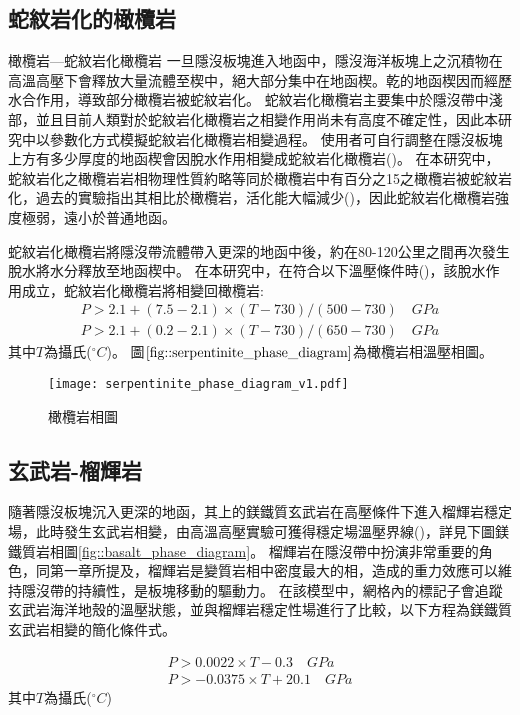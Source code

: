 \subsection{蛇紋岩化的橄欖岩}
橄欖岩---蛇紋岩化橄欖岩
一旦隱沒板塊進入地函中，隱沒海洋板塊上之沉積物在高溫高壓下會釋放大量流體至楔中，絕大部分集中在地函楔。乾的地函楔因而經歷水合作用，導致部分橄欖岩被蛇紋岩化。
蛇紋岩化橄欖岩主要集中於隱沒帶中淺部，並且目前人類對於蛇紋岩化橄欖岩之相變作用尚未有高度不確定性，因此本研究中以參數化方式模擬蛇紋岩化橄欖岩相變過程。
使用者可自行調整在隱沒板塊上方有多少厚度的地函楔會因脫水作用相變成蛇紋岩化橄欖岩(\citealp{Tan2012})。
在本研究中，蛇紋岩化之橄欖岩岩相物理性質約略等同於橄欖岩中有百分之15之橄欖岩被蛇紋岩化，過去的實驗指出其相比於橄欖岩，活化能大幅減少(\citealp{hilairet2007high})，因此蛇紋岩化橄欖岩強度極弱，遠小於普通地函。

蛇紋岩化橄欖岩將隱沒帶流體帶入更深的地函中後，約在80-120公里之間再次發生脫水將水分釋放至地函楔中。
在本研究中，在符合以下溫壓條件時(\citealp{Ulmer1995})，該脫水作用成立，蛇紋岩化橄欖岩將相變回橄欖岩:
\begin{align}
P > 2.1 + (7.5-2.1)\times (T-730)/(500-730) \quad GPa \\
P > 2.1 + (0.2-2.1) \times (T-730)/(650-730) \quad GPa
\end{align}
其中$T$為攝氏($^\circ C$)。
圖$\ref{fig::serpentinite_phase_diagram}$為橄欖岩相溫壓相圖。

\begin{figure*}[ht!]
    \centering
    \texttt{[image: serpentinite\_phase\_diagram\_v1.pdf]}
    \caption[橄欖岩相圖]{橄欖岩相圖}
    \label{fig::serpentinite_phase_diagram}
\end{figure*}

\subsection{玄武岩-榴輝岩}

隨著隱沒板塊沉入更深的地函，其上的鎂鐵質玄武岩在高壓條件下進入榴輝岩穩定場，此時發生玄武岩相變，由高溫高壓實驗可獲得穩定場溫壓界線(\citealp{Hacker2003})，詳見下圖鎂鐵質岩相圖\ref{fig::basalt_phase_diagram}。
榴輝岩在隱沒帶中扮演非常重要的角色，同第一章所提及，榴輝岩是變質岩相中密度最大的相，造成的重力效應可以維持隱沒帶的持續性，是板塊移動的驅動力。
在該模型中，網格內的標記子會追蹤玄武岩海洋地殼的溫壓狀態，並與榴輝岩穩定性場進行了比較，以下方程為鎂鐵質玄武岩相變的簡化條件式。

\begin{align}
    P > 0.0022 \times T -0.3  \quad GPa\\
    P > -0.0375 \times T + 20.1  \quad GPa
\end{align}
其中$T$為攝氏($^\circ C$)

